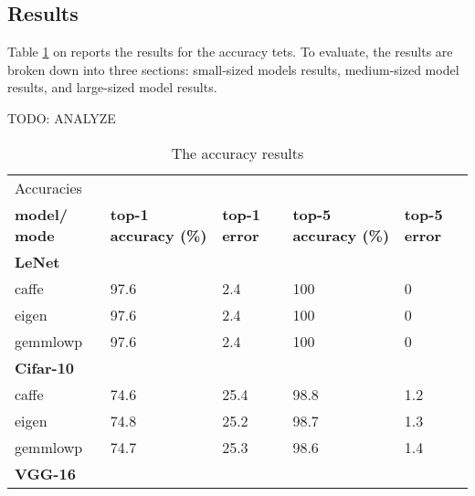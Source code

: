 \subsection{Results}
Table \ref{tbl:accuracies} on \pageref{tbl:accuracies} reports the results for the accuracy tets. To evaluate, the results are broken down into three sections: small-sized models results, medium-sized model results, and large-sized model results.

TODO: ANALYZE

\begin{table}[]
\centering
\caption[Accuracy results]{The accuracy results}
\label{tbl:accuracies}
\begin{tabular}{lllll}
\multicolumn{5}{l}{Accuracies}                                                                                                   \\
\textbf{model/ mode} & \textbf{top-1 accuracy (\%)} & \textbf{top-1 error} & \textbf{top-5 accuracy (\%)} & \textbf{top-5 error} \\
\multicolumn{5}{l}{\textbf{LeNet}}                                                                                               \\
caffe                & 97.6                         & 2.4                  & 100                          & 0                    \\
eigen                & 97.6                         & 2.4                  & 100                          & 0                    \\
gemmlowp             & 97.6                         & 2.4                  & 100                          & 0                    \\
\multicolumn{5}{l}{\textbf{Cifar-10}}                                                                                            \\
caffe                & 74.6                         & 25.4                 & 98.8                         & 1.2                  \\
eigen                & 74.8                         & 25.2                 & 98.7                         & 1.3                  \\
gemmlowp             & 74.7                         & 25.3                 & 98.6                         & 1.4                  \\
\multicolumn{5}{l}{\textbf{VGG-16}}                                                                                              \\

\end{tabular}
\end{table}
